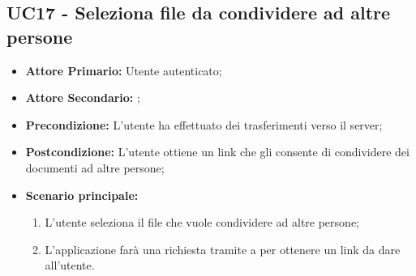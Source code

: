 \subsection{UC17 - Seleziona file da condividere ad altre persone}
\label{UC17}
\begin{itemize}
\item \textbf{Attore Primario:} Utente autenticato;
\item \textbf{Attore Secondario:} ;
\item \textbf{Precondizione:} L'utente ha effettuato dei trasferimenti verso il server;
\item \textbf{Postcondizione:} L'utente ottiene un link che gli consente di condividere dei documenti ad altre persone;
\item \textbf{Scenario principale:}
    \begin{enumerate}
    \item L'utente seleziona il file che vuole condividere ad altre persone;
    \item L'applicazione farà una richiesta tramite  a  per ottenere un link da dare all'utente.
    \end{enumerate}
\end{itemize}